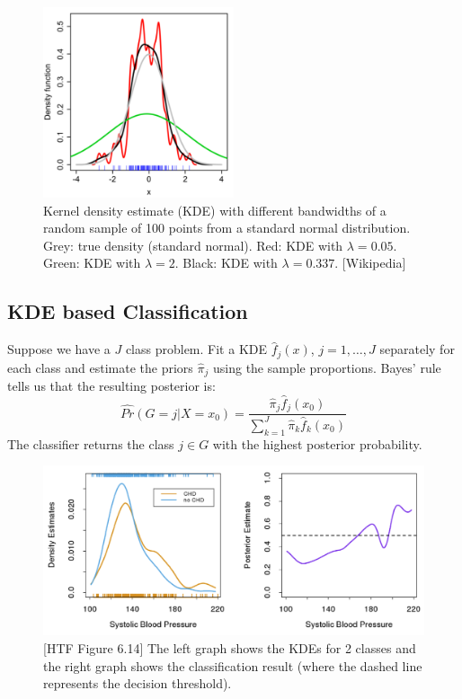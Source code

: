 \documentclass[a4paper]{article}
\begin{document}
\begin{figure}
\centering
\includegraphics[width=0.5\textwidth]{KernelWidthSelection.png}
\caption{\label{fig:KernelWidth}Kernel density estimate (KDE) with different bandwidths of a random sample of 100 points from a standard normal distribution. Grey: true density (standard normal). Red: KDE with $\lambda=0.05$. Green: KDE with $\lambda=2$. Black: KDE with $\lambda=0.337$. [Wikipedia]}
\end{figure}

\subsection{KDE based Classification}

Suppose we have a $J$ class problem. Fit a KDE $\hat{f}_j(x)$, $j = 1, \ldots, J$ separately for each class and estimate the priors $\hat{\pi}_j$ using the sample proportions. Bayes' rule tells us that the resulting posterior is: 
$$\hat{Pr}(G=j | X=x_0)=\frac{\hat{\pi}_j \hat{f}_j (x_0)}{\sum_{k=1}^J \hat{\pi}_k \hat{f}_k (x_0)}$$
The classifier returns the class $j \in G$ with the highest posterior probability.

\begin{figure}
\centering
\includegraphics[width=1.0\textwidth]{Figure614.png}
\caption{\label{fig:Figure614}[HTF Figure 6.14] The left graph shows the KDEs for 2 classes and the right graph shows the classification result (where the dashed line represents the decision threshold).}
\end{figure}
\end{document}
